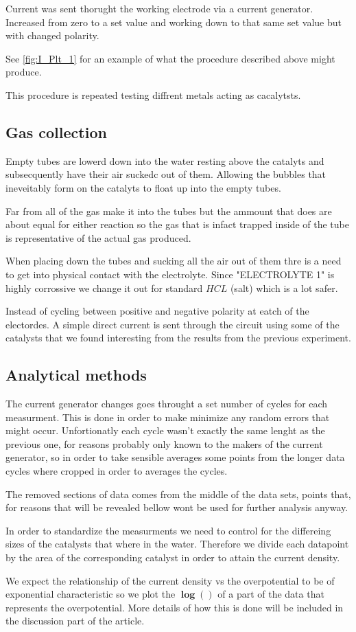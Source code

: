 \documentclass[twocolumn]{revtex4-2}
\begin{document}
Current was sent thorught the working electrode via a current generator. Increased
from zero to a set value and working down to that same set value but with changed 
polarity.


See \ref{fig:I_Plt_1} for an example of what the procedure described above might produce.

This procedure is repeated testing diffrent metals acting as cacalytsts.

\subsection{Gas collection}
Empty tubes are lowerd down into the water resting above the catalyts and subsecquently
have their air suckedc out of them. Allowing the bubbles that ineveitably form on the
catalyts to float up into the empty tubes. 

\par 
Far from all of the gas make it into the tubes but the ammount that does are about equal
for either reaction so the gas that is infact trapped inside of the tube is representative
of the actual gas produced.

\par 
When placing down the tubes and sucking all the air out of them thre is a need to get into 
physical contact with the electrolyte. Since "ELECTROLYTE 1" is highly corrossive we change 
it out for standard $HCL$ (salt) which is a lot safer.
\par 
Instead of cycling between positive and negative polarity at eatch of the electordes. A simple 
direct current is sent through the circuit using some of the catalysts that we found 
interesting from the results from the previous experiment.
\par


\subsection{Analytical methods}
The current generator changes goes throught a set number of cycles for each measurment.
This is done in order to make minimize any random errors that might occur. Unfortionatly
each cycle wasn't exactly the same lenght as the previous one, for reasons probably only
known to the makers of the current generator, so in order to take sensible averages
some points from the longer data cycles where cropped in order to averages the cycles.
\par
The removed sections of data comes from the middle of the data sets, points that, for reasons 
that will be revealed bellow wont be used for further analysis anyway.
\par
In order to standardize the measurments we need to control for the differeing sizes of the catalysts
that where in the water. Therefore we divide each datapoint by the area of the corresponding
catalyst in order to attain the current density.
\par
We expect the relationship of the current density vs the overpotential to be of exponential
characteristic so we plot the $\bm{\log{()}} $ of a part of the data that represents the overpotential.
More details of how this is done will be included in the discussion part of the article.
\end{document}
